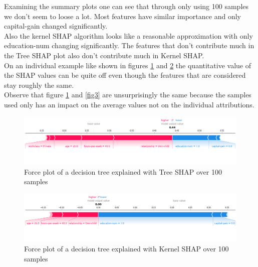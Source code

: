 \documentclass[conference]{IEEEtran}
\begin{document}
Examining the summary plots one can see that through only using 100 samples we don't seem to loose a lot. Most features have similar importance and only capital-gain changed significantly.\\
Also the kernel SHAP algorithm looks like a reasonable approximation with only education-num changing significantly. 
The features that don't contribute much in the Tree SHAP plot also don't contribute much in Kernel SHAP.\\
On an individual example like shown in figures \ref{fig8} and \ref{fig9} the quantitative value of the SHAP values can be quite off even though the features that are considered stay roughly the same.\\
Observe that figure \ref{fig8} and \ref{fig3} are unsurprisingly the same because the samples used only has an impact on the average values not on the individual attributions.

\begin{figure}[htbp]
\centerline{
	\includegraphics[width=\linewidth]{../fig/ex_02_TreeShap_100_Samples_ForcePlot_sample_1.png}
}
\caption{Force plot of a decision tree explained with Tree SHAP over 100 samples}
\label{fig8}
\end{figure}

\begin{figure}[htbp]
\centerline{
	\includegraphics[width=\linewidth]{../fig/ex_02_KernelShap_100_Samples_ForcePlot_sample_1.png}
}
\caption{Force plot of a decision tree explained with Kernel SHAP over 100 samples}
\label{fig9}
\end{figure}
\end{document}
